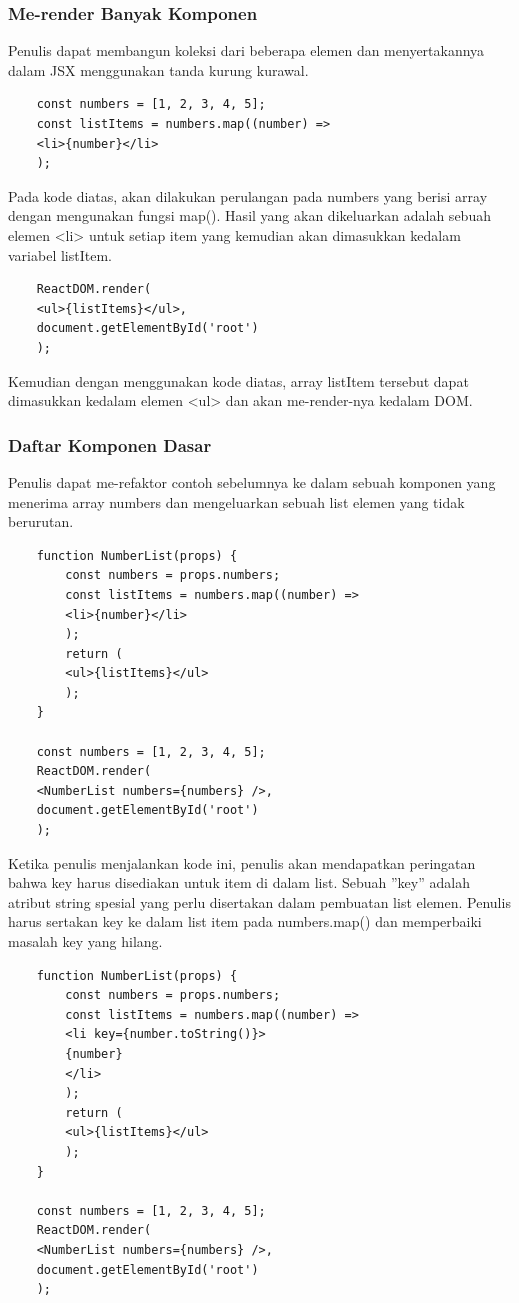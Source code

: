 \subsubsection{Me-render Banyak Komponen}
Penulis dapat membangun koleksi dari beberapa elemen dan menyertakannya dalam JSX  menggunakan tanda kurung kurawal. 
\begin{lstlisting}
	const numbers = [1, 2, 3, 4, 5];
	const listItems = numbers.map((number) =>
	<li>{number}</li>
	);
\end{lstlisting}
Pada kode diatas, akan dilakukan perulangan pada numbers yang berisi array dengan mengunakan fungsi map(). Hasil yang akan dikeluarkan adalah sebuah elemen <li> untuk setiap item yang kemudian akan dimasukkan kedalam variabel listItem. 
\begin{lstlisting}
	ReactDOM.render(
	<ul>{listItems}</ul>,
	document.getElementById('root')
	);
\end{lstlisting}
Kemudian dengan menggunakan kode diatas, array listItem tersebut dapat dimasukkan kedalam elemen <ul> dan akan me-render-nya kedalam DOM.

\subsubsection{Daftar Komponen Dasar}
Penulis dapat me-refaktor contoh sebelumnya ke dalam sebuah komponen yang menerima array numbers dan mengeluarkan sebuah list elemen yang tidak berurutan.
\begin{lstlisting}
	function NumberList(props) {
		const numbers = props.numbers;
		const listItems = numbers.map((number) =>
		<li>{number}</li>
		);
		return (
		<ul>{listItems}</ul>
		);
	}
	
	const numbers = [1, 2, 3, 4, 5];
	ReactDOM.render(
	<NumberList numbers={numbers} />,
	document.getElementById('root')
	);
\end{lstlisting}
Ketika penulis menjalankan kode ini, penulis akan mendapatkan peringatan bahwa key harus disediakan untuk item di dalam list. Sebuah ”key” adalah atribut string spesial yang perlu disertakan dalam pembuatan list elemen. Penulis harus sertakan key ke dalam list item pada numbers.map() dan memperbaiki masalah key yang hilang.
\begin{lstlisting}
	function NumberList(props) {
		const numbers = props.numbers;
		const listItems = numbers.map((number) =>
		<li key={number.toString()}>
		{number}
		</li>
		);
		return (
		<ul>{listItems}</ul>
		);
	}
	
	const numbers = [1, 2, 3, 4, 5];
	ReactDOM.render(
	<NumberList numbers={numbers} />,
	document.getElementById('root')
	);
\end{lstlisting}
